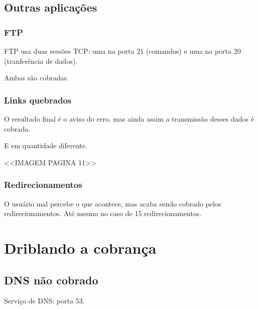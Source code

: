 \documentclass[brazil]{beamer}
\begin{document}
\subsection{Outras aplicações}

\begin{frame}[fragile]
    \frametitle{FTP}
    FTP usa duas sessões TCP: uma na porta 21 (comandos) e uma na porta 20 (tranferência de dados).

    \vspace{0.5cm}
    Ambas são cobradas.
\end{frame}

\begin{frame}[fragile]
    \frametitle{Links quebrados}
    O resultado final é o aviso do erro, mas ainda assim a transmissão desses dados é cobrada.

    E em quantidade diferente.

    <<IMAGEM PAGINA 11>>
\end{frame}

\begin{frame}[fragile]
    \frametitle{Redirecionamentos}
    O usuário mal percebe o que acontece, mas acaba sendo cobrado pelos redirecionamentos. Até mesmo no caso de 15 redirecionamentos.
\end{frame}

\section{Driblando a cobrança}

\subsection{DNS não cobrado}
\begin{frame}[fragile]
    Serviço de DNS: porta 53.

    \vspace
\end{frame}
\end{document}
